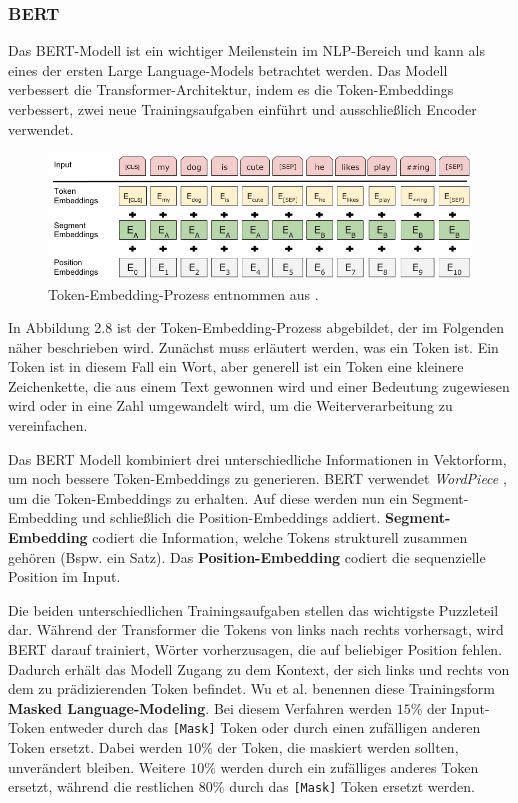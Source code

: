 \documentclass[12pt,letterpaper,ngerman]{article}
\begin{document}
\subsubsection{BERT}
Das BERT-Modell \cite{conf/naacl/DevlinCLT19} 
ist ein wichtiger Meilenstein im NLP-Bereich und kann 
als eines der ersten Large Language-Models betrachtet werden.
Das Modell verbessert die Transformer-Architektur, 
indem es die Token-Embeddings verbessert, zwei neue Trainingsaufgaben einführt
und ausschließlich Encoder verwendet.
\begin{figure}[H]
  \begin{center}
    \includegraphics[scale=0.5]{abb/BERT-Tokens.png}
  \end{center}
  \caption{
    Token-Embedding-Prozess entnommen aus 
    \cite{conf/naacl/DevlinCLT19}.
  }
\end{figure}
In Abbildung 2.8 ist der Token-Embedding-Prozess abgebildet,
der im Folgenden näher beschrieben wird. Zunächst muss erläutert werden, 
was ein Token ist. Ein Token ist in diesem Fall ein Wort, 
aber generell ist ein Token eine kleinere Zeichenkette, die aus einem 
Text gewonnen wird und einer Bedeutung zugewiesen wird oder in eine 
Zahl umgewandelt wird, um die Weiterverarbeitung zu vereinfachen.

Das BERT Modell kombiniert drei unterschiedliche Informationen
in Vektorform, um noch bessere Token-Embeddings zu generieren. BERT
verwendet \textit{WordPiece} \cite{wu2016googlesneuralmachinetranslation},
um die Token-Embeddings zu erhalten.
Auf diese werden nun ein Segment-Embedding und schließlich die
Position-Embeddings addiert. {\bf Segment-Embedding} codiert die Information,
welche Tokens strukturell zusammen gehören (Bspw. ein Satz).
Das {\bf Position-Embedding} codiert die sequenzielle Position im Input.


Die beiden unterschiedlichen Trainingsaufgaben stellen das wichtigste
Puzzleteil dar. Während der Transformer die Tokens von links nach rechts
vorhersagt, wird BERT darauf trainiert, Wörter vorherzusagen, die auf
beliebiger Position fehlen. Dadurch erhält das Modell Zugang zu dem
Kontext, der sich links und rechts von dem zu prädizierenden Token befindet.
Wu et al. benennen diese Trainingsform {\bf Masked Language-Modeling}.
Bei diesem Verfahren werden $15 \%$ der Input-Token entweder durch das
\verb|[Mask]| Token oder durch einen zufälligen anderen Token ersetzt.
Dabei werden $10 \%$ der Token, die maskiert werden sollten,
unverändert bleiben. Weitere $10 \%$ werden durch ein zufälliges anderes
Token ersetzt, während die restlichen $80 \%$ durch das \verb|[Mask]| Token 
ersetzt werden.
\pagebreak
\end{document}
